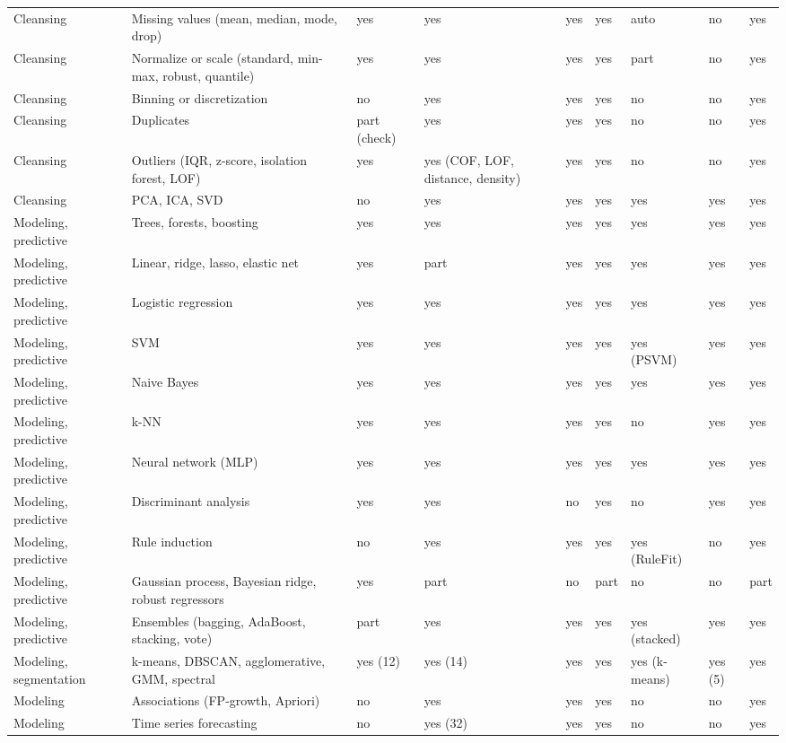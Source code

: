 {\begin{longtable}{@{}L{2.4cm}L{3.9cm}L{1.35cm}L{1.35cm}L{1.05cm}L{1.05cm}L{1.35cm}L{1.05cm}L{1.35cm}@{}}
Cleansing & Missing values (mean, median, mode, drop) & yes & yes & yes & yes & auto & no & yes \\
Cleansing & Normalize or scale (standard, min-max, robust, quantile) & yes & yes & yes & yes & part & no & yes \\
Cleansing & Binning or discretization & no & yes & yes & yes & no & no & yes \\
Cleansing & Duplicates & part (check) & yes & yes & yes & no & no & yes \\
Cleansing & Outliers (IQR, z-score, isolation forest, LOF) & yes & yes (COF, LOF, distance, density) & yes & yes & no & no & yes \\
Cleansing & PCA, ICA, SVD & no & yes & yes & yes & yes & yes & yes \\
Modeling, predictive & Trees, forests, boosting & yes & yes & yes & yes & yes & yes & yes \\
Modeling, predictive & Linear, ridge, lasso, elastic net & yes & part & yes & yes & yes & yes & yes \\
Modeling, predictive & Logistic regression & yes & yes & yes & yes & yes & yes & yes \\
Modeling, predictive & SVM & yes & yes & yes & yes & yes (PSVM) & yes & yes \\
Modeling, predictive & Naive Bayes & yes & yes & yes & yes & yes & yes & yes \\
Modeling, predictive & k-NN & yes & yes & yes & yes & no & yes & yes \\
Modeling, predictive & Neural network (MLP) & yes & yes & yes & yes & yes & yes & yes \\
Modeling, predictive & Discriminant analysis & yes & yes & no & yes & no & yes & yes \\
Modeling, predictive & Rule induction & no & yes & yes & yes & yes (RuleFit) & no & yes \\
Modeling, predictive & Gaussian process, Bayesian ridge, robust regressors & yes & part & no & part & no & no & part \\
Modeling, predictive & Ensembles (bagging, AdaBoost, stacking, vote) & part & yes & yes & yes & yes (stacked) & yes & yes \\
Modeling, segmentation & k-means, DBSCAN, agglomerative, GMM, spectral & yes (12) & yes (14) & yes & yes & yes (k-means) & yes (5) & yes \\
Modeling & Associations (FP-growth, Apriori) & no & yes & yes & yes & no & no & yes \\
Modeling & Time series forecasting & no & yes (32) & yes & yes & no & no & yes \\

\end{longtable}}
